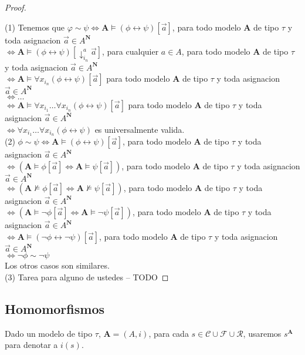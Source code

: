 \begin{proof}
  $  $

  (1) Tenemos que $\varphi\sim\psi \iff \mathbf{A}\models(\phi\leftrightarrow\psi)[\vec{a}]$, para todo modelo $\mathbf{A}$ de tipo $\tau$ y toda asignacion $\vec{a}\in A^\mathbf{N}$\\
  $\iff \mathbf{A}\models(\phi\leftrightarrow\psi)[\downarrow_{i_n}^a\vec{a}]$, para cualquier $a \in A$, para todo modelo $\mathbf{A}$ de tipo $\tau$ y toda asignacion $\vec{a}\in A^\mathbf{N}$\\
  $\iff \mathbf{A}\models\forall x_{i_n}(\phi\leftrightarrow\psi)[\vec{a}]$ para todo modelo $\mathbf{A}$ de tipo $\tau$ y toda asignacion $\vec{a}\in A^\mathbf{N}$\\
  $\iff \dots$\\
  $\iff \mathbf{A}\models\forall x_{i_1} \dots \forall x_{i_n}(\phi\leftrightarrow\psi)[\vec{a}]$ para todo modelo $\mathbf{A}$ de tipo $\tau$ y toda asignacion $\vec{a}\in A^\mathbf{N}$\\
  $\iff \forall x_{i_1} \dots \forall x_{i_n}(\phi\leftrightarrow\psi)$ es universalmente valida.\\
  
  (2) $\phi\sim\psi \iff \mathbf{A}\models(\phi\leftrightarrow\psi)[\vec{a}]$, para todo modelo $\mathbf{A}$ de tipo $\tau$ y toda asignacion $\vec{a} \in A^\mathbf{N}$\\
  $\iff (\mathbf{A}\models\phi[\vec{a}] \iff \mathbf{A}\models\psi[\vec{a}])$, para todo modelo $\mathbf{A}$ de tipo $\tau$ y toda asignacion $\vec{a} \in A^\mathbf{N}$\\
  $\iff (\mathbf{A}\not\models\phi[\vec{a}] \iff \mathbf{A}\not\models\psi[\vec{a}])$, para todo modelo $\mathbf{A}$ de tipo $\tau$ y toda asignacion $\vec{a} \in A^\mathbf{N}$\\
  $\iff (\mathbf{A}\models\neg\phi[\vec{a}] \iff \mathbf{A}\models\neg\psi[\vec{a}])$, para todo modelo $\mathbf{A}$ de tipo $\tau$ y toda asignacion $\vec{a} \in A^\mathbf{N}$\\
  $\iff \mathbf{A}\models(\neg\phi\leftrightarrow\neg\psi)[\vec{a}]$, para todo modelo $\mathbf{A}$ de tipo $\tau$ y toda asignacion $\vec{a} \in A^\mathbf{N}$\\
  $\iff \neg\phi\sim\neg\psi$\\
  Los otros casos son similares. \\
  (3) Tarea para alguno de ustedes -- TODO
\end{proof}

\subsection{Homomorfismos}
\begin{definition}
  Dado un modelo de tipo $\tau$, $\mathbf{A} = (A, i)$, para cada $s\in\mathcal{C}\cup\mathcal{F}\cup\mathcal{R}$, usaremos $s^\mathbf{A}$
  para denotar a $i(s)$.
\end{definition}

